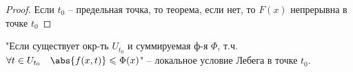 \begin{proof}\thmslashn
	
	Если $t_0$ -- предельная точка, то теорема, если нет, то $F(x)$ непрерывна в точке $t_0$
	
\end{proof}

\begin{definition}\thmslashn
	
	"Если существует окр-ть $U_{t_0}$ и суммируемая ф-я $\Phi$, т.ч. $\forall t \in U_{t_0}\quad \abs{f(x, t)} \leqslant \Phi(x)$" -- локальное условие Лебега в точке $t_0$.
	
\end{definition}


